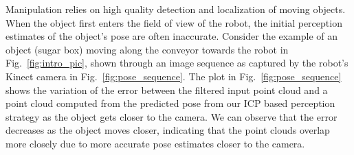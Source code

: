 \documentclass[conference]{IEEEtran}
\begin{document}
Manipulation relies on high quality detection and localization of moving objects. When the object first enters the field of view of the robot, the initial perception estimates of the object's pose are often inaccurate. Consider the example of an object (sugar box) moving along the conveyor towards the robot in Fig.~\ref{fig:intro_pic}, shown through an image sequence as captured by the robot's Kinect camera in Fig.~\ref{fig:pose_sequence}. 
The plot in Fig.~\ref{fig:pose_sequence} shows the variation of the error between the filtered input point cloud and a point cloud computed from the predicted pose from our ICP based perception strategy as the object gets closer to the camera. We can observe that the error decreases as the object moves closer, indicating that the point clouds overlap more closely due to more accurate pose estimates closer to the camera.
\end{document}

